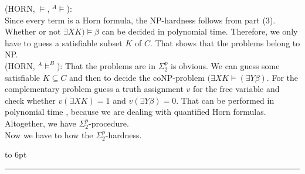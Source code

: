 \documentclass[12pt]{article}
\newcommand{\AMB}{\mbox{$^A$\hspace{-0.5mm}$\models^B$}}
\newcommand{\AM}{\mbox{$^A$\hspace{-0.5mm}$\models$}}
\newenvironment{proof}{\parindent=0pt{\bf Proof: }}{
   \hspace*{\fill}\hbox to 6pt{\leaders\hrule width 6pt height 6pt\hfill}\par}
\begin{document}
\begin{proof}
(HORN, $\models$, \AM):\\
Since every term is a Horn formula, the NP-hardness follows from part (3).
 Whether or not $\exists X K) \models \beta$ can be decided in polynomial time. Therefore, we only have to guess a satisfiable subset $K$ of $C$. That shows that the problems belong to NP.\\

(HORN, \AMB):  That the problems are in $\Sigma^p_2$ is obvious. We can guess some satisfiable $K \subseteq C$ and
then to decide the coNP-problem $(\exists X K \models (\exists Y \beta)$. For the complementary problem guess a
truth assignment $v$ for the free variable and check whether $v(\exists X K)=1$ and $v(\exists Y \beta)=0$.
That can be performed in polynomial time , because we are dealing with quantified Horn formulas. Altogether,
we have $\Sigma^p_2$-procedure.\\

Now we have to how the $\Sigma^p_2$-hardness.
\end{proof}
\vspace*{3mm}
\end{document}
